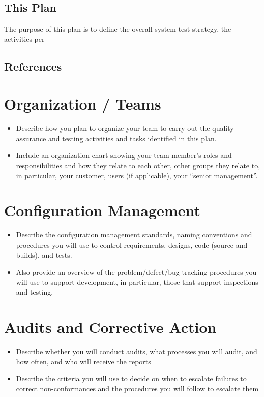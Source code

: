 \documentclass[11pt]{report}
\begin{document}
\section{This Plan}
The purpose of this plan is to define the overall system test strategy, the activities per

\section{References}

\chapter{Organization / Teams}
\begin{itemize}
\item Describe how you plan to organize your team to carry out the quality assurance and testing
  activities and tasks identified in this plan.
\item Include an organization chart showing your team member’s roles and responsibilities and how
  they relate to each other, other groups they relate to, in particular, your customer, users (if
  applicable), your “senior management”.
\end{itemize}



\chapter{Configuration Management}
\begin{itemize}
\item Describe the configuration management standards, naming conventions and procedures you will
  use to control requirements, designs, code (source and builds), and tests.
\item Also provide an overview of the problem/defect/bug tracking procedures you will use to support
  development, in particular, those that support inspections and testing.
\end{itemize}


\chapter{Audits and Corrective Action}
\begin{itemize}
\item Describe whether you will conduct audits, what processes you will audit, and how often, and
  who will receive the reports
\item Describe the criteria you will use to decide on when to escalate failures to correct
  non-conformances and the procedures you will follow to escalate them
\end{itemize}
\end{document}
